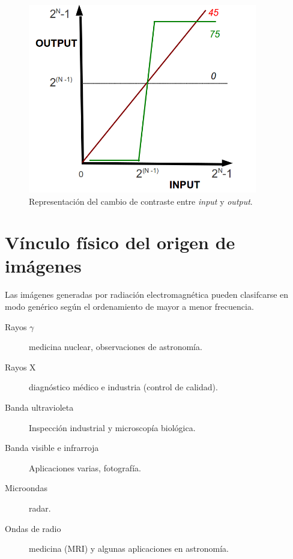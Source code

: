 %

\begin{center}
\begin{figure} [!h]

\centering
\includegraphics[width=10cm]{Figuras/Fig2_2.png}
   
\caption{Representaci\'on del cambio de contraste entre \textit{input} y \textit{output}.}
\label{Fig2_2}
\end{figure}
\end{center}

%
\section{V\'inculo f\'isico del origen de im\'agenes}

Las im\'agenes generadas por radiaci\'on electromagn\'etica pueden clasifcarse en modo gen\'erico seg\'un el ordenamiento de mayor a menor frecuencia.

\begin{description}
 \item[Rayos $\gamma$] medicina nuclear, observaciones de astronom\'ia.
 \item [Rayos X] diagn\'ostico m\'edico e industria (control de calidad).
 \item[Banda ultravioleta] Inspecci\'on industrial y microscop\'ia biol\'ogica.
 \item[Banda visible e infrarroja] Aplicaciones varias, fotograf\'ia.
 \item[Microondas] radar.
 \item[Ondas de radio] medicina (MRI) y algunas aplicaciones en astronom\'ia. 
\end{description}




